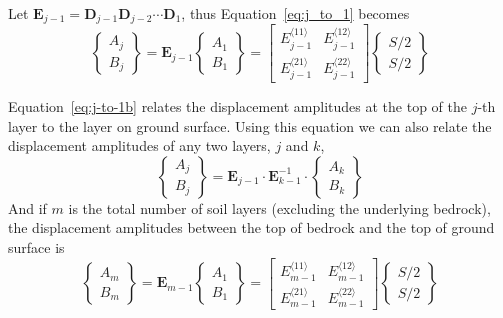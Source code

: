 \documentclass[11pt,letterpaper]{article}
\begin{document}
Let $ \mathbf{E}_{j-1} = \mathbf{D}_{j-1}\mathbf{D}_{j-2}\cdots\mathbf{D}_{1} $, thus Equation~\eqref{eq:j_to_1} becomes
\begin{equation}\label{eq:j-to-1b}
\left\{\begin{array}{c}
A_j \\
B_j
\end{array} \right\} = \mathbf{E}_{j-1}\left\{\begin{array}{c}
A_1 \\
B_1
\end{array} \right\}  = \left[\begin{array}{cc}
E_{j-1}^{\langle 11\rangle} & E_{j-1}^{\langle 12\rangle} \\
E_{j-1}^{\langle 21\rangle} & E_{j-1}^{\langle 22\rangle}
\end{array} \right]\left\{\begin{array}{c}
S/2\\
S/2
\end{array} \right\}
\end{equation}

Equation~\eqref{eq:j-to-1b} relates the displacement amplitudes at the top of the $j$-th layer to the layer on ground surface. Using this equation we can also relate the displacement amplitudes of any two layers, $j$ and $k$,
\begin{equation}
    \left\{\begin{array}{c}
    A_j \\
    B_j
    \end{array} \right\} = \mathbf{E}_{j-1}\cdot\mathbf{E}_{k-1}^{-1}\cdot\left\{\begin{array}{c}
    A_k \\
    B_k
    \end{array} \right\}
\end{equation}
And if $m$ is the total number of soil layers (excluding the underlying bedrock), the displacement amplitudes between the top of bedrock and the top of ground surface is
\begin{equation}\label{eq:m-to-1}
\left\{\begin{array}{c}
A_m \\
B_m
\end{array} \right\} = \mathbf{E}_{m-1}\left\{\begin{array}{c}
A_1 \\
B_1
\end{array} \right\}  = \left[\begin{array}{cc}
E_{m-1}^{\langle 11\rangle} & E_{m-1}^{\langle 12\rangle} \\
E_{m-1}^{\langle 21\rangle} & E_{m-1}^{\langle 22\rangle}
\end{array} \right]\left\{\begin{array}{c}
S/2\\
S/2
\end{array} \right\}
\end{equation}
\end{document}
